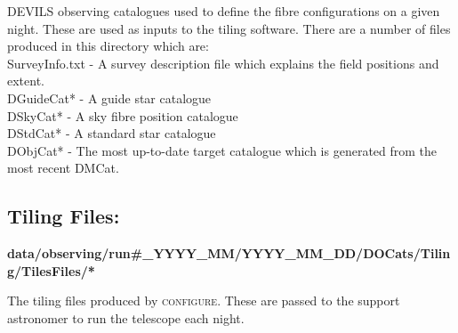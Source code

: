 \documentclass[12pt]{article}
\begin{document}
DEVILS observing catalogues used to define the fibre configurations on a given night. These are used as inputs to the tiling software. There are a number of files produced in this directory which are:\\

SurveyInfo.txt - A survey description file which explains the field positions and extent.\\
DGuideCat* - A guide star catalogue \\
DSkyCat* - A sky fibre position catalogue \\
DStdCat* - A standard star catalogue \\
DObjCat* - The most up-to-date target catalogue which is generated from the most recent DMCat. \\
 
 
\subsection{Tiling Files:}

 \textbf{data/observing/run\#\_YYYY\_MM/YYYY\_MM\_DD/DOCats/Tiling/TilesFiles/*}
 
 The tiling files produced by \textsc{configure}. These are passed to the support astronomer to run the telescope each night.   
\end{document}
